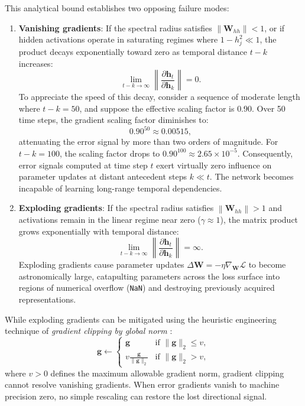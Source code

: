 \documentclass[../../main.tex]{subfiles}
\begin{document}
This analytical bound establishes two opposing failure modes:
\begin{enumerate}
    \item \textbf{Vanishing gradients}: If the spectral radius satisfies $\left\| \mathbf{W}_{hh} \right\| < 1$, or if hidden activations operate in saturating regimes where $1 - h_j^2 \ll 1$, the product decays exponentially toward zero as temporal distance $t - k$ increases:
    \begin{equation}
    \lim_{t - k \to \infty} \left\| \frac{\partial \mathbf{h}_t}{\partial \mathbf{h}_k} \right\| = 0.
    \end{equation}
    To appreciate the speed of this decay, consider a sequence of moderate length where $t - k = 50$, and suppose the effective scaling factor is $0.90$. Over 50 time steps, the gradient scaling factor diminishes to:
    \begin{equation}
    0.90^{50} \approx 0.00515,
    \end{equation}
    attenuating the error signal by more than two orders of magnitude. For $t - k = 100$, the scaling factor drops to $0.90^{100} \approx 2.65 \times 10^{-5}$. Consequently, error signals computed at time step $t$ exert virtually zero influence on parameter updates at distant antecedent steps $k \ll t$. The network becomes incapable of learning long-range temporal dependencies.
    
    \item \textbf{Exploding gradients}: If the spectral radius satisfies $\left\| \mathbf{W}_{hh} \right\| > 1$ and activations remain in the linear regime near zero ($\gamma \approx 1$), the matrix product grows exponentially with temporal distance:
    \begin{equation}
    \lim_{t - k \to \infty} \left\| \frac{\partial \mathbf{h}_t}{\partial \mathbf{h}_k} \right\| = \infty.
    \end{equation}
    Exploding gradients cause parameter updates $\Delta \mathbf{W} = -\eta \nabla_{\mathbf{W}} \mathcal{L}$ to become astronomically large, catapulting parameters across the loss surface into regions of numerical overflow (\texttt{NaN}) and destroying previously acquired representations.
\end{enumerate}

While exploding gradients can be mitigated using the heuristic engineering technique of \textit{gradient clipping by global norm} \citep{pascanu2013difficulty}:
\begin{equation}
\mathbf{g} \leftarrow \begin{cases}
\mathbf{g} & \text{if } \|\mathbf{g}\|_2 \le v, \\
v \frac{\mathbf{g}}{\|\mathbf{g}\|_2} & \text{if } \|\mathbf{g}\|_2 > v,
\end{cases}
\label{eq:gradient_clipping}
\end{equation}
where $v > 0$ defines the maximum allowable gradient norm, gradient clipping cannot resolve vanishing gradients. When error gradients vanish to machine precision zero, no simple rescaling can restore the lost directional signal.
\end{document}
